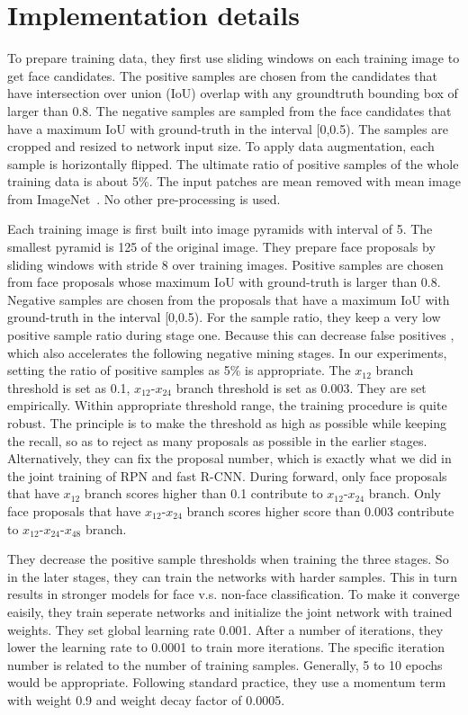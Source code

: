 \documentclass[10pt,twocolumn,letterpaper]{article}
\begin{document}
\section{Implementation details}
 To prepare training data, they first use sliding windows on each training image to get face candidates. The positive samples are chosen from the candidates that have intersection over union (IoU) overlap with any groundtruth bounding box of larger than 0.8. The negative samples are sampled from the face candidates that have a maximum IoU with ground-truth in the interval [0,0.5). The samples are cropped and resized to network input size. To apply data augmentation, each sample is horizontally flipped. The ultimate ratio of positive samples of the whole training data is about 5\%. The input patches are mean removed with mean image from ImageNet~\cite{name3}. No other pre-processing is used.
 \par Each training image is first built into image pyramids with interval of 5. The smallest pyramid is 1\/25 of the original image. They prepare face proposals by sliding windows with stride 8 over training images. Positive samples are chosen from face proposals whose maximum IoU with ground-truth is larger than 0.8. Negative samples are chosen from the proposals that have a maximum IoU with ground-truth in the interval [0,0.5). For the sample ratio, they keep a very low positive sample ratio during stage one. Because this can decrease false positives , which also accelerates the following negative mining stages. In our experiments, setting the ratio of positive samples as 5\% is appropriate. The $x_{12}$ branch threshold is set as 0.1, $x_{12}$-$x_{24}$ branch threshold is set as 0.003. They are set empirically. Within appropriate threshold range, the training procedure is quite robust. The principle is to make the threshold as high as possible while keeping the recall, so as to reject as many proposals as possible in the earlier stages. Alternatively, they can fix the proposal number, which is exactly what we did in the joint training of RPN and fast R-CNN. During forward, only face proposals that have $x_{12}$ branch scores higher than 0.1 contribute to $x_{12}$-$x_{24}$ branch. Only face proposals that have $x_{12}$-$x_{24}$ branch scores higher score than 0.003 contribute to $x_{12}$-$x_{24}$-$x_{48}$ branch.
 \par They decrease the positive sample thresholds when training the three stages. So in the later stages, they can train the networks with harder samples. This in turn results in stronger models for face v.s. non-face classification. To make it converge eaisily, they train seperate networks and initialize the joint network with trained weights. They set global learning rate 0.001. After a number of iterations, they lower the learning rate to 0.0001 to train more iterations. The specific iteration number is related to the number of training samples. Generally, 5 to 10 epochs would be appropriate. Following standard practice, they use a momentum term with weight 0.9 and weight decay factor of 0.0005.
\end{document}
